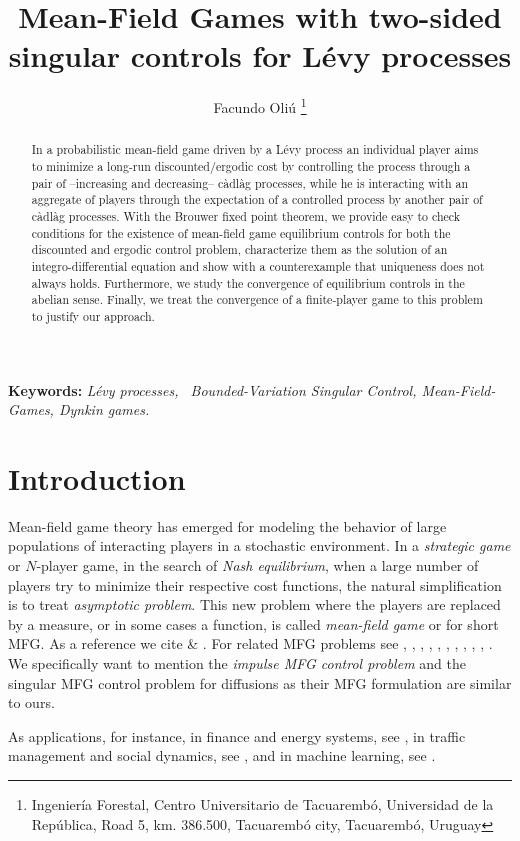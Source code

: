 \documentclass{article}
\title{Mean-Field Games with two-sided singular controls for L\'evy processes}
\author{Facundo Oli\'u
\thanks{Ingeniería Forestal, Centro Universitario de Tacuarembó, Universidad de la República,%
            Road 5, km. 386.500, 
            Tacuarembó city,
            Tacuarembó,
            Uruguay}}
\begin{document}
\maketitle


\begin{abstract}

In a probabilistic mean-field game driven by a L\'evy process an individual player aims to minimize a long-run discounted/ergodic cost by controlling the process through a pair of –increasing and decreasing– c\`adl\`ag processes, while he is interacting with an aggregate of players through the expectation of a controlled process by another pair of c\`adl\`ag processes.
%
With the Brouwer fixed point theorem, we provide easy to check conditions for the existence of mean-field game equilibrium controls for both the discounted and ergodic control problem, characterize them as the solution of an integro-differential equation and show with a counterexample that uniqueness does not always holds. Furthermore, we study the convergence of equilibrium controls in the abelian sense.
%
Finally, we treat the convergence of a finite-player game to this problem to justify our approach.
\end{abstract}
%
\textbf{Keywords:} \textit{L\'evy processes, \ Bounded-Variation Singular Control,  Mean-Field-Games, Dynkin games.}


\section{Introduction}\label{Ch4:Introduction}
Mean-field game theory has emerged for modeling the behavior of large populations of interacting players in a stochastic environment.
 In a \emph{strategic game} or $N$-player game,
in the search of \emph{Nash equilibrium}, when a large number of players try to minimize their respective cost functions, the natural simplification is to treat \emph{asymptotic problem}. This new problem where the players are replaced by a measure, or in some cases a function, is called \emph{mean-field game} or for short MFG.
 As a reference we cite \cite{CD(2018)} \& \cite{LL}. For related MFG problems see \cite{CFL}, \cite{Lacker}, \cite{FU},  \cite{LackerZ}, \cite{GR}, \cite{Tobi},  \cite{CG}, \cite{ABF}, \cite{CDF}, \cite{BDTY}, \cite{BCP}. We specifically want to mention the \emph{impulse MFG control problem}  \cite{Tobi} and the singular MFG control problem for diffusions \cite{CMO} as their MFG formulation are similar to ours.
 
As applications, for instance, in finance and energy systems, see \cite{Carmona}, in traffic management and social dynamics, see \cite{ADRIANOFIESTA!}, and in machine learning, see \cite{SUBRAMANIAN}. 
\end{document}
